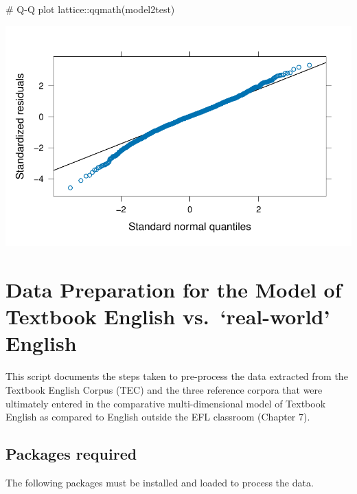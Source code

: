 \documentclass[
  letterpaper,
  DIV=11,
  numbers=noendperiod]{scrreprt}
\newenvironment{Shaded}{\begin{snugshade}}{\end{snugshade}}
\newcommand{\CommentTok}[1]{\textcolor[rgb]{0.37,0.37,0.37}{#1}}
\newcommand{\FunctionTok}[1]{\textcolor[rgb]{0.28,0.35,0.67}{#1}}
\newcommand{\NormalTok}[1]{\textcolor[rgb]{0.00,0.23,0.31}{#1}}
\newcommand{\SpecialCharTok}[1]{\textcolor[rgb]{0.37,0.37,0.37}{#1}}
\begin{document}
\begin{Shaded}
\begin{Highlighting}[]
\CommentTok{\# Q{-}Q plot}
\NormalTok{lattice}\SpecialCharTok{::}\FunctionTok{qqmath}\NormalTok{(model2test)}
\end{Highlighting}
\end{Shaded}

\includegraphics{E_Ch6_Analysis_files/figure-pdf/lmer-diagnostics-3.pdf}

\chapter{Data Preparation for the Model of Textbook English
vs.~`real-world'
English}\label{data-preparation-for-the-model-of-textbook-english-vs.-real-world-english}

This script documents the steps taken to pre-process the data extracted
from the Textbook English Corpus (TEC) and the three reference corpora
that were ultimately entered in the comparative multi-dimensional model
of Textbook English as compared to English outside the EFL classroom
(Chapter 7).

\section{Packages required}\label{packages-required-2}

The following packages must be installed and loaded to process the data.
\end{document}
